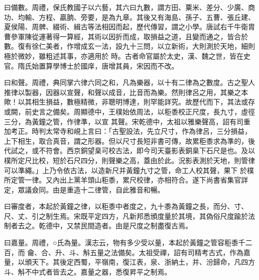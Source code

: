 \begin{pinyinscope}
 曰備數。周禮，保氏教國子以六藝，其六曰九數，謂方田、粟米、差分、少廣、商功、均輸、方程、贏朒、旁要，是為九章。其後又有海島、孫子、五曹、張丘建、夏侯陽、周髀、綴術、緝古等法相因而起，歷代傳習，謂之小學。唐試右千牛衛胄曹參軍陳從運著得一算經，其術以因折而成，取損益之道，且變而通之，皆合於數。復有徐仁美者，作增成玄一法，設九十三問，以立新術，大則測於天地，細則極於微妙，雖粗述其事，亦適用於
 時。古者命官屬於太史，漢、魏之世，皆在史官。隋氏始置算學博士於國庠，唐增其員，宋因而不改。



 曰和聲。周禮，典同掌六律六同之和，凡為樂器，以十有二律為之數度。古之聖人推律以製器，因器以宣聲，和聲以成音，比音而為樂。然則律呂之用，其樂之本歟！以其相生損益，數極精微，非聰明博達，則罕能詳究。故歷代而下，其法或存或闕，前史言之備矣。周顯德中，王樸始依周法，以秬黍校正尺度，長九寸，虛徑三分，為黃鐘之管，作律準，以宣
 其聲。宋乾德中，太祖以雅樂聲高，詔有司重加考正。時判太常寺和峴上言曰：「古聖設法，先立尺寸，作為律呂，三分損益，上下相生，取合真音，謂之形器。但以尺寸長短非書可傳，故累秬黍求為準的，後代試之，或不符會。西京銅望臬可校古法，即今司天臺影表銅臬下石尺是也。及以樸所定尺比校，短於石尺四分，則聲樂之高，蓋由於此。況影表測於天地，則管律可以準繩。」上乃令依古法，以造新尺并黃鐘九寸之管，命工人校其聲，果下
 於樸所定管一律。又內出上黨羊頭山秬黍，累尺校律，亦相符合。遂下尚書省集官詳定，眾議僉同。由是重造十二律管，自此雅音和暢。



 曰審度者，本起於黃鐘之律，以秬黍中者度之，九十黍為黃鐘之長，而分、寸、尺、丈、引之制生焉。宋既平定四方，凡新邦悉頒度量於其境，其偽俗尺度踰於法制者去之。乾德中，又禁民間造者。由是尺度之制盡復古焉。



 曰嘉量。周禮，○氏為量。漢志云，物有多少受以量，本起於黃鐘之管容秬黍千二百，而
 龠、合、升、斗、斛五量之法備矣。太祖受禪，詔有司精考古式，作為嘉量，以頒天下。其後定西蜀，平嶺南，復江表，泉、浙納土，并、汾歸命，凡四方斗、斛不中式者皆去之。嘉量之器，悉復昇平之制焉。



\end{pinyinscope}
